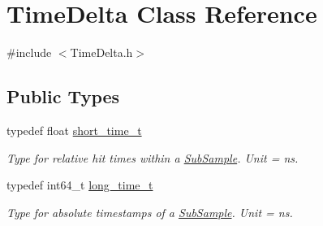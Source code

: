 \hypertarget{classTimeDelta}{\section{Time\-Delta Class Reference}
\label{classTimeDelta}
}


{\ttfamily \#include $<$Time\-Delta.\-h$>$}

\subsection*{Public Types}
\begin{DoxyCompactItemize}
\item 
\hypertarget{classTimeDelta_afe4b7adde6a0645a8ada61f39e198c8e}{typedef float \hyperlink{classTimeDelta_afe4b7adde6a0645a8ada61f39e198c8e}{short\-\_\-time\-\_\-t}}\label{classTimeDelta_afe4b7adde6a0645a8ada61f39e198c8e}

\begin{DoxyCompactList}\small\item\em Type for relative hit times within a \hyperlink{classSubSample}{Sub\-Sample}. Unit = ns. \end{DoxyCompactList}\item 
\hypertarget{classTimeDelta_a7713378e4dff3b1ed5f407260dbca5d6}{typedef int64\-\_\-t \hyperlink{classTimeDelta_a7713378e4dff3b1ed5f407260dbca5d6}{long\-\_\-time\-\_\-t}}\label{classTimeDelta_a7713378e4dff3b1ed5f407260dbca5d6}

\begin{DoxyCompactList}\small\item\em Type for absolute timestamps of a \hyperlink{classSubSample}{Sub\-Sample}. Unit = ns. \end{DoxyCompactList}\end{DoxyCompactItemize}
